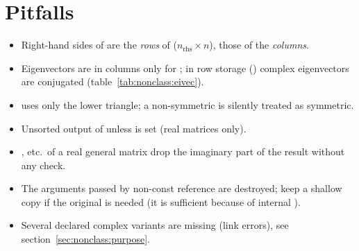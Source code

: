 \section{Pitfalls}\label{sec:nonclass:pitfalls}
\begin{itemize}
\item Right-hand sides of  are the \emph{rows} of  ($n_{\mathrm{rhs}}\times n$), those of  the \emph{columns}.
\item Eigenvectors are in columns only for ; in row storage () complex eigenvectors are conjugated
(table~\ref{tab:nonclass:eivec}).
\item {} uses only the lower triangle; a non-symmetric  is silently treated as symmetric.
\item Unsorted output of  unless  is set (real matrices only).
\item {},  etc.\ of a real general matrix drop the imaginary part of the result without any check.
\item The arguments passed by non-const reference are destroyed; keep a shallow copy if the original is needed (it is sufficient because of internal ).
\item Several declared complex variants are missing (link errors), see section~\ref{sec:nonclass:purpose}.
\end{itemize}
